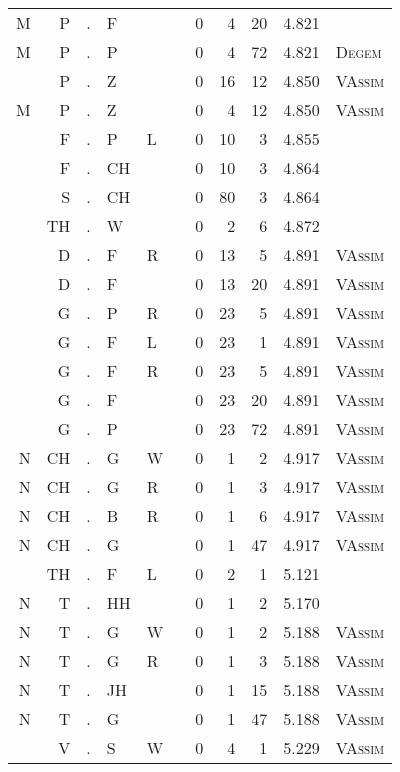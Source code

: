 \begin{longtable}{r@{ } r@{ } c@{ } l@{ } l@{ } l@{ } r r r r l }
M & P & . & F &   &   & 0 & 4 & 20 & 4.821 &  \\
M & P & . & P &   &   & 0 & 4 & 72 & 4.821 & \textsc{Degem} \\
  & P & . & Z &   &   & 0 & 16 & 12 & 4.850 & \textsc{VAssim} \\
M & P & . & Z &   &   & 0 & 4 & 12 & 4.850 & \textsc{VAssim} \\
  & F & . & P & L &   & 0 & 10 & 3 & 4.855 &  \\
  & F & . & CH &   &   & 0 & 10 & 3 & 4.864 &  \\
  & S & . & CH &   &   & 0 & 80 & 3 & 4.864 &  \\
  & TH & . & W &   &   & 0 & 2 & 6 & 4.872 &  \\
  & D & . & F & R &   & 0 & 13 & 5 & 4.891 & \textsc{VAssim} \\
  & D & . & F &   &   & 0 & 13 & 20 & 4.891 & \textsc{VAssim} \\
  & G & . & P & R &   & 0 & 23 & 5 & 4.891 & \textsc{VAssim} \\
  & G & . & F & L &   & 0 & 23 & 1 & 4.891 & \textsc{VAssim} \\
  & G & . & F & R &   & 0 & 23 & 5 & 4.891 & \textsc{VAssim} \\
  & G & . & F &   &   & 0 & 23 & 20 & 4.891 & \textsc{VAssim} \\
  & G & . & P &   &   & 0 & 23 & 72 & 4.891 & \textsc{VAssim} \\
N & CH & . & G & W &   & 0 & 1 & 2 & 4.917 & \textsc{VAssim} \\
N & CH & . & G & R &   & 0 & 1 & 3 & 4.917 & \textsc{VAssim} \\
N & CH & . & B & R &   & 0 & 1 & 6 & 4.917 & \textsc{VAssim} \\
N & CH & . & G &   &   & 0 & 1 & 47 & 4.917 & \textsc{VAssim} \\
  & TH & . & F & L &   & 0 & 2 & 1 & 5.121 &  \\
N & T & . & HH &   &   & 0 & 1 & 2 & 5.170 &  \\
N & T & . & G & W &   & 0 & 1 & 2 & 5.188 & \textsc{VAssim} \\
N & T & . & G & R &   & 0 & 1 & 3 & 5.188 & \textsc{VAssim} \\
N & T & . & JH &   &   & 0 & 1 & 15 & 5.188 & \textsc{VAssim} \\
N & T & . & G &   &   & 0 & 1 & 47 & 5.188 & \textsc{VAssim} \\
  & V & . & S & W &   & 0 & 4 & 1 & 5.229 & \textsc{VAssim} \\

\end{longtable}
